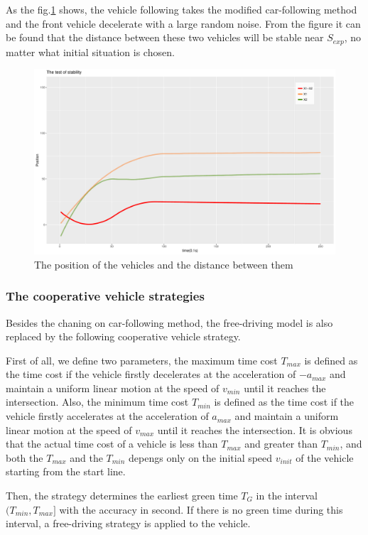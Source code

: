 \documentclass[a4paper,UTF8]{paper}
\begin{document}
As the fig.\ref{carf} shows, the vehicle following takes the modified car-following method and the front vehicle decelerate with a large random noise. From the figure it can be found that the distance between these two vehicles will be stable near $S_{exp}$, no matter what initial situation is chosen.
\begin{figure}
\centering
\includegraphics[width=\textwidth]{NearlyGoDie_2.pdf}
\caption{The position of the vehicles and the distance between them}
\label{carf}
\end{figure}
\subsubsection{The cooperative vehicle strategies}
\label{section:tgs}
Besides the chaning on car-following method, the free-driving model is also replaced by the following cooperative vehicle strategy. 

First of all, we define two parameters, the maximum time cost $T_{max}$ is defined as the time cost if the vehicle firstly decelerates at the acceleration of $-a_{max}$ and maintain a uniform linear motion at the speed of $v_{min}$ until it reaches the intersection. Also, the minimum time cost $T_{min}$ is defined as the time cost if the vehicle firstly accelerates at the acceleration of $a_{max}$ and maintain a uniform linear motion at the speed of $v_{max}$ until it reaches the intersection. It is obvious that the actual time cost of a vehicle is less than $T_{max}$ and greater than $T_{min}$, and both the $T_{max}$ and the $T_{min}$ depengs only on the initial speed $v_{init}$ of the vehicle starting from the start line.

Then, the strategy determines the earliest green time $T_G$ in the interval $(T_{min},T_{max}]$ with the accuracy in second. If there is no green time during this interval, a free-driving strategy is applied to the vehicle.
\end{document}
